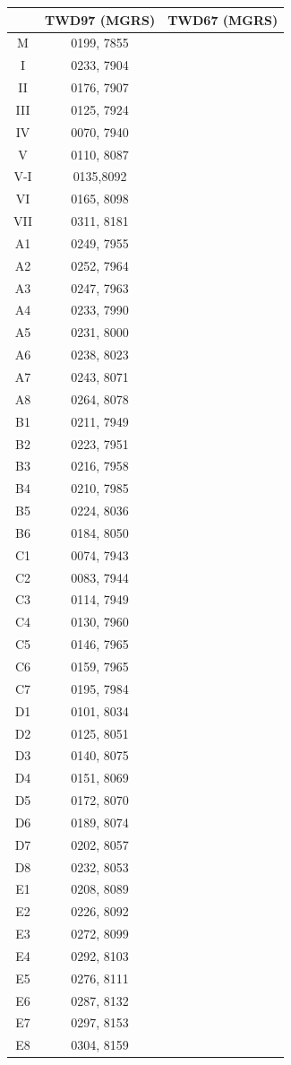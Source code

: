\documentclass{article}
\begin{document}
\begin{multicols}{2}
\begin{tabular}{|c|c|c|}
	\hline
	& TWD97 (MGRS) & TWD67 (MGRS)\\  
	\hline
	M & 0199, 7855 & \\ 
	\hline
	I & 0233, 7904 & \\ 
	II & 0176, 7907 & \\ 
	III & 0125, 7924 & \\ 
	IV & 0070, 7940 & \\ 
	V & 0110, 8087 & \\ 
	V-I & 0135,8092 & \\
	VI & 0165, 8098 & \\ 
	VII & 0311, 8181  & \\ 
	\hline
	A1 & 0249, 7955 & \\
	A2 & 0252, 7964 & \\
	A3 & 0247, 7963 & \\
	A4 & 0233, 7990 & \\
	A5 & 0231, 8000 & \\
	A6 & 0238, 8023 & \\
	A7 & 0243, 8071 & \\
	A8 & 0264, 8078 & \\
	\hline
	B1 & 0211, 7949 & \\
	B2 & 0223, 7951 & \\
	B3 & 0216, 7958 & \\
	B4 & 0210, 7985 & \\
	B5 & 0224, 8036 & \\
	B6 & 0184, 8050 & \\
	\hline
	C1 & 0074, 7943 & \\
	C2 & 0083, 7944 & \\
	C3 & 0114, 7949 & \\
	C4 & 0130, 7960 & \\
	C5 & 0146, 7965 & \\
	C6 & 0159, 7965 & \\
	C7 & 0195, 7984 & \\
	\hline
	D1 & 0101, 8034 & \\
	D2 & 0125, 8051 & \\
	D3 & 0140, 8075 & \\
	D4 & 0151, 8069 & \\
	D5 & 0172, 8070 & \\
	D6 & 0189, 8074 & \\
	D7 & 0202, 8057 & \\
	D8 & 0232, 8053 & \\
	\hline
	E1 & 0208, 8089 & \\
	E2 & 0226, 8092 & \\
	E3 & 0272, 8099 & \\
	E4 & 0292, 8103 & \\
	E5 & 0276, 8111 & \\
	E6 & 0287, 8132 & \\
	E7 & 0297, 8153 & \\
	E8 & 0304, 8159 & \\
	\hline
\end{tabular}


\end{multicols}
\end{document}
